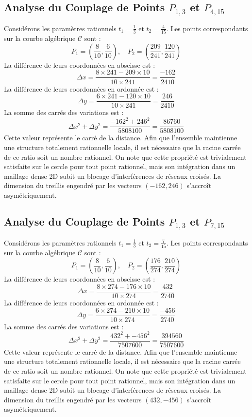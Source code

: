 \documentclass[12pt, a4paper]{article}
\begin{document}
\subsection{Analyse du Couplage de Points $P_{1,3}$ et $P_{4,15}$}
Considérons les paramètres rationnels $t_1 = \frac{1}{3}$ et $t_2 = \frac{4}{15}$.
Les points correspondants sur la courbe algébrique $\mathcal{C}$ sont :
$$ P_1 = \left( \frac{8}{10}, \frac{6}{10} \right), \quad P_2 = \left( \frac{209}{241}, \frac{120}{241} \right) $$
La différence de leurs coordonnées en abscisse est :
$$ \Delta x = \frac{8 \times 241 - 209 \times 10}{10 \times 241} = \frac{-162}{2410} $$
La différence de leurs coordonnées en ordonnée est :
$$ \Delta y = \frac{6 \times 241 - 120 \times 10}{10 \times 241} = \frac{246}{2410} $$
La somme des carrés des variations est :
$$ \Delta x^2 + \Delta y^2 = \frac{ -162^2 + 246^2 }{ 5808100 } = \frac{ 86760 }{ 5808100 } $$
Cette valeur représente le carré de la distance. Afin que l'ensemble maintienne une structure totalement rationnelle locale, il est nécessaire que la racine carrée de ce ratio soit un nombre rationnel. On note que cette propriété est trivialement satisfaite sur le cercle pour tout point rationnel, mais son intégration dans un maillage dense 2D subit un blocage d'interférences de réseaux croisés. La dimension du treillis engendré par les vecteurs $( -162, 246 )$ s'accroît asymétriquement.


\subsection{Analyse du Couplage de Points $P_{1,3}$ et $P_{7,15}$}
Considérons les paramètres rationnels $t_1 = \frac{1}{3}$ et $t_2 = \frac{7}{15}$.
Les points correspondants sur la courbe algébrique $\mathcal{C}$ sont :
$$ P_1 = \left( \frac{8}{10}, \frac{6}{10} \right), \quad P_2 = \left( \frac{176}{274}, \frac{210}{274} \right) $$
La différence de leurs coordonnées en abscisse est :
$$ \Delta x = \frac{8 \times 274 - 176 \times 10}{10 \times 274} = \frac{432}{2740} $$
La différence de leurs coordonnées en ordonnée est :
$$ \Delta y = \frac{6 \times 274 - 210 \times 10}{10 \times 274} = \frac{-456}{2740} $$
La somme des carrés des variations est :
$$ \Delta x^2 + \Delta y^2 = \frac{ 432^2 + -456^2 }{ 7507600 } = \frac{ 394560 }{ 7507600 } $$
Cette valeur représente le carré de la distance. Afin que l'ensemble maintienne une structure totalement rationnelle locale, il est nécessaire que la racine carrée de ce ratio soit un nombre rationnel. On note que cette propriété est trivialement satisfaite sur le cercle pour tout point rationnel, mais son intégration dans un maillage dense 2D subit un blocage d'interférences de réseaux croisés. La dimension du treillis engendré par les vecteurs $( 432, -456 )$ s'accroît asymétriquement.
\end{document}
